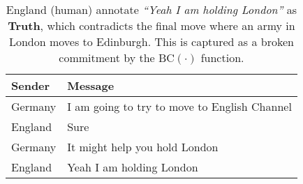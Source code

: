 \begin{table}[t]
    \centering
    \begin{tabular}{p{1.2cm}p{5.5cm}}
    \hline
    \textbf{Sender} & \textbf{Message}   \\ 
    \hline
     Germany & \small{I am going to try to move to English Channel} \\ 
    \rowcolor{grayish}  %
    England & \small{Sure} \\
     Germany & \small{It might help you hold London} \\ 
    \rowcolor{grayish}  %
    England & \small{Yeah I am holding London} \\
    \end{tabular}
    \caption{England (human) annotate \textit{``Yeah I am holding London''} as \textbf{Truth}, which contradicts the final move where an army in London moves to Edinburgh. This is captured as a broken commitment by the $\text{BC}(\cdot)$ function.}
    \label{fig:lie_annotation_2}
\end{table}
